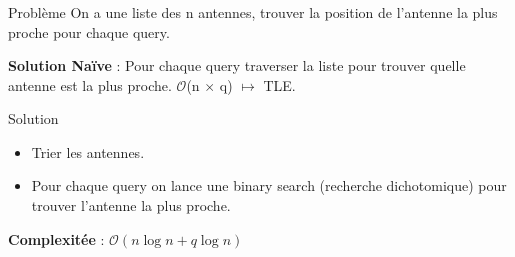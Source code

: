 \begin{frame}
    \frametitle{\problemtitle}
    \begin{block}{Problème}
        On a une liste des n antennes, trouver la position de l'antenne la plus proche pour chaque query.
    \end{block}
    \pause
    \textbf{Solution Naïve} : Pour chaque query traverser la liste pour trouver quelle antenne est la plus proche.
    \pause
     $\mathcal{O}$(n $\times$ q) $\mapsto$ TLE.\\
     \pause
     \begin{block}{Solution}
        \begin{itemize}
            \item<+-> Trier les antennes.
            \item<+-> Pour chaque query on lance une binary search (recherche dichotomique) pour trouver l'antenne la plus proche.
        \end{itemize}
        \pause
        \textbf{Complexitée} : $\mathcal{O}(n \log n + q\log n)$
    \end{block}
\end{frame}
